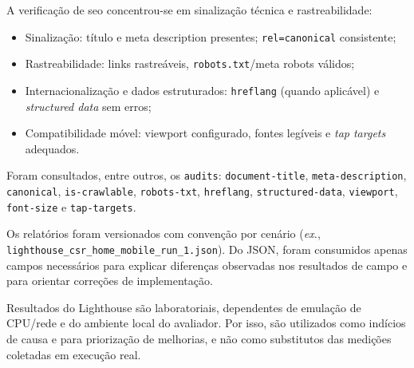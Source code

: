 A verificação de \acrshort{seo} concentrou-se em sinalização técnica e rastreabilidade:
\begin{itemize}
  \item Sinalização: título e meta description presentes; \texttt{rel=canonical} consistente;
  \item Rastreabilidade: links rastreáveis, \texttt{robots.txt}/meta robots válidos;
  \item Internacionalização e dados estruturados: \texttt{hreflang} (quando aplicável) e \textit{structured data} sem erros;
  \item Compatibilidade móvel: viewport configurado, fontes legíveis e \textit{tap targets} adequados.
\end{itemize}
Foram consultados, entre outros, os \texttt{audits}: \texttt{document-title}, \texttt{meta-description}, \texttt{canonical}, \texttt{is-crawlable}, \texttt{robots-txt}, \texttt{hreflang}, \texttt{structured-data}, \texttt{viewport}, \texttt{font-size} e \texttt{tap-targets}.

Os relatórios foram versionados com convenção por cenário (\textit{ex.}, \texttt{lighthouse\_csr\_home\_mobile\_run\_1.json}). Do JSON, foram consumidos apenas campos necessários para explicar diferenças observadas nos resultados de campo e para orientar correções de implementação.

Resultados do Lighthouse são laboratoriais, dependentes de emulação de CPU/rede e do ambiente local do avaliador. Por isso, são utilizados como indícios de causa e para priorização de melhorias, e não como substitutos das medições coletadas em execução real.